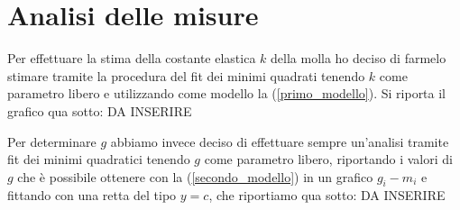 \documentclass{article}
\begin{document}
	\section{Analisi delle misure}
	Per effettuare la stima della costante elastica $k$ della molla ho deciso di farmelo stimare tramite la procedura del fit dei minimi quadrati tenendo $k$ come parametro libero e utilizzando come modello la (\ref{primo_modello}). Si riporta il grafico qua sotto:
	DA INSERIRE
	
\noindent Per determinare $g$ abbiamo invece deciso di effettuare sempre un'analisi tramite fit dei minimi quadratici tenendo $g$ come parametro libero, riportando i valori di $g$ che è possibile ottenere con la (\ref{secondo_modello}) in un grafico $g_i - m_i$ e fittando con una retta del tipo $y=c$, che riportiamo qua sotto:
DA INSERIRE
\end{document}
